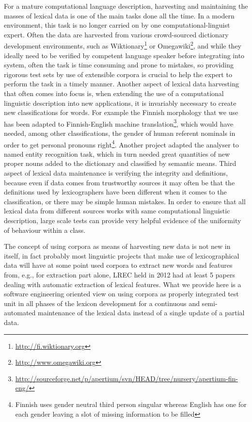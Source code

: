 \documentclass[a5paper]{article}
\begin{document}
For a mature computational language description, harvesting and maintaining the
masses of lexical data is one of the main tasks done all the time. In a modern
environment, this task is no longer carried on by one computational-linguist
expert. Often the data are harvested from various crowd-sourced dictionary
development environments, such as
Wiktionary\footnote{\url{http://fi.wiktionary.org}} or
O\-mega\-wi\-ki\footnote{\url{http://www.omegawiki.org}}, and while they
ideally need to be verified by competent language speaker before integrating
into system, often the task is time consuming and prone to mistakes, so
providing rigorous test sets by use of extensible corpora is crucial to help
the expert to perform the task in a timely manner. Another aspect of lexical
data harvesting that often comes into focus is, when extending the use of a
computational linguistic description into new applications, it is invariably
necessary to create new classifications for words. For example the Finnish
morphology that we use has been adapted to Finnish-English machine
translation\footnote{\url{http://sourceforge.net/p/apertium/svn/HEAD/tree/nursery/apertium-fin-eng/}},
which would have needed, among other classifications, the gender of human
referent nominals in order to get personal pronouns right\footnote{Finnish uses
gender neutral third person singular whereas English has one for each gender
leaving a slot of missing information to be filled}. Another project adapted
the analyser to named entity recognition task, which in turn needed great
quantities of new proper nouns added to the dictionary and classified by
semantic means. Third aspect of lexical data maintenance is verifying the
integrity and definitions, because even if data comes from trustworthy sources
it may often be that the definitions used by lexicographers have been
different when it comes to the classification, or there may be simple human
mistakes. In order to ensure that all lexical data from different sources works
with same computational linguistic description, large scale tests can provide
very helpful evidence of the uniformity of behaviour within a class.

The concept of using corpora as means of harvesting new data is not new in
itself, in fact probably most linguistic projects that make use of
lexicographical data will have at some point used corpora to extract new words
and features from, e.g., for extraction part alone, LREC held in 2012 had at
least 5 papers dealing with automatic extraction of lexical features.  What we
provide here is a software engineering oriented view on using corpora as
properly integrated test unit in all phases of the lexicon development for a
continuous and semi-automated maintenance of the lexical data instead of a
single update of a partial data.
\end{document}
